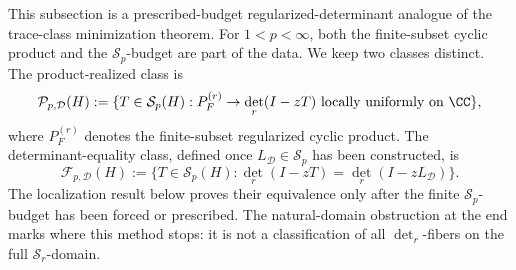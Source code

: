   This subsection is a prescribed-budget regularized-determinant analogue of the
  trace-class minimization theorem.  For \(1<p<\infty\), both the finite-subset
  cyclic product and the \(\mathcal S_p\)-budget are part of the data.  We keep
  two classes distinct.  The product-realized class is
  \[
    \mathcal P_{p,\mathcal D}(H)
    :=\{T\in\mathcal S_p(H):P_F^{(r)}\to\det_r(I-zT)
    \text{ locally uniformly on }\CC\},
  \]
  where \(P_F^{(r)}\) denotes the finite-subset regularized cyclic product.  The
  determinant-equality class, defined once \(L_{\mathcal D}\in\mathcal S_p\) has
  been constructed, is
  \[
    \mathcal F_{p,\mathcal D}(H)
    :=\{T\in\mathcal S_p(H):
    \det_r(I-zT)=\det_r(I-zL_{\mathcal D})\}.
  \]
  The localization result below proves their equivalence only after the finite
  \(\mathcal S_p\)-budget has been forced or prescribed.  The natural-domain
  obstruction at the end marks where this method stops: it is not a
  classification of all \(\det_r\)-fibers on the full \(\mathcal S_r\)-domain.
